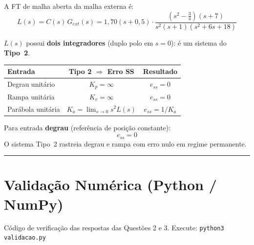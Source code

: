 \documentclass[12pt,a4paper]{article}
\begin{document}
A FT de malha aberta da malha externa é:
\[
  L(s) = C(s)\,G_{ext}(s) = 1{,}70(s+0{,}5)
         \cdot \frac{(s^2-\tfrac{3}{4})(s+7)}{s^2(s+1)(s^2+6s+18)}
\]

$L(s)$ possui \textbf{dois integradores} (duplo polo em $s = 0$): é um
sistema do \textbf{Tipo~2}.

\begin{center}
\begin{tabular}{lcc}
\toprule
Entrada & Tipo 2 $\Rightarrow$ Erro SS & Resultado \\
\midrule
Degrau unitário & $K_p = \infty$ & $e_{ss} = 0$ \\
Rampa unitária & $K_v = \infty$ & $e_{ss} = 0$ \\
Parábola unitária & $K_a = \lim_{s\to 0}s^2L(s)$ & $e_{ss} = 1/K_a$\\
\bottomrule
\end{tabular}
\end{center}

\begin{resposta}
Para entrada \textbf{degrau} (referência de posição constante):
\[
  \boxed{e_{ss} = 0}
\]
O sistema Tipo~2 rastreia degrau e rampa com erro nulo em regime permanente.
\end{resposta}

\vspace{10pt}\hrule\vspace{10pt}

\section*{Validação Numérica (Python / NumPy)}

\begin{metodo}
  Código de verificação das respostas das Questões 2 e 3.
  Execute: \texttt{python3 validacao.py}
\end{metodo}
\end{document}
